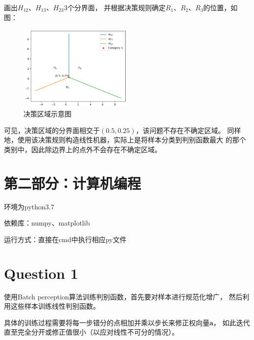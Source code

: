 \documentclass{article}
\newcommand{\question}[1]{\section*{Question #1}}
\begin{document}
画出$H_{12}$、$H_{13}$、$H_{23}$3个分界面，
并根据决策规则确定$R_1$、$R_2$、$R_3$的位置，如图：

\begin{figure}[ht]
	\centering
	\includegraphics[width=0.5\textwidth]{Figure_1.png}
	\caption{决策区域示意图}
	\label{figl}
\end{figure}

可见，决策区域的分界面相交于$(0.5, 0.25)$，该问题不存在不确定区域。
同样地，使用该决策规则构造线性机器，实际上是将样本分类到判别函数最大
的那个类别中，因此除边界上的点外不会存在不确定区域。

\section*{第二部分：计算机编程}
环境为python3.7

依赖库：numpy、matplotlib

运行方式：直接在cmd中执行相应py文件

\question{1}
使用Batch perception算法训练判别函数，首先要对样本进行规范化增广，
然后利用这些样本训练线性判别函数。

具体的训练过程需要将每一步错分的点相加并乘以步长来修正权向量$\pmb{a}$，
如此迭代直至完全分开或修正值很小（以应对线性不可分的情况）。
\end{document}
